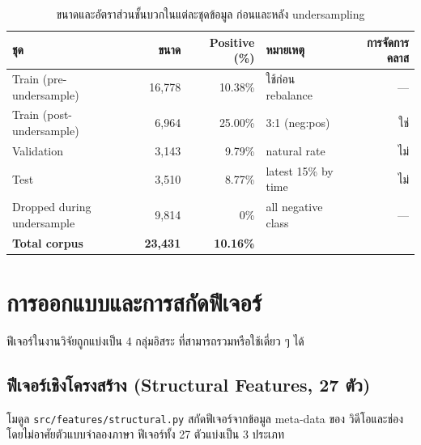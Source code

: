\begin{table}[H]
\centering
\caption{ขนาดและอัตราส่วนชั้นบวกในแต่ละชุดข้อมูล ก่อนและหลัง undersampling}
\label{tab:split-stats}
\begin{tabularx}{\textwidth}{lrrXr}
\toprule
\textbf{ชุด} & \textbf{ขนาด} & \textbf{Positive (\%)} & \textbf{หมายเหตุ} & \textbf{การจัดการคลาส} \\
\midrule
Train (pre-undersample)   & 16{,}778 & 10.38\% & ใช้ก่อน rebalance & --- \\
Train (post-undersample)  & 6{,}964  & 25.00\% & 3:1 (neg:pos) & ใช่ \\
Validation                & 3{,}143  & 9.79\%  & natural rate & ไม่ \\
Test                      & 3{,}510  & 8.77\%  & latest 15\% by time & ไม่ \\
\midrule
Dropped during undersample & 9{,}814 & 0\%      & all negative class & --- \\
\midrule
\textbf{Total corpus}     & \textbf{23{,}431} & \textbf{10.16\%} & & \\
\bottomrule
\end{tabularx}
\end{table}

\section{การออกแบบและการสกัดฟีเจอร์}
\label{sec:method-features}

ฟีเจอร์ในงานวิจัยถูกแบ่งเป็น 4 กลุ่มอิสระ ที่สามารถรวมหรือใช้เดี่ยว ๆ ได้

\subsection{ฟีเจอร์เชิงโครงสร้าง (Structural Features, 27 ตัว)}

โมดูล \texttt{src/features/structural.py} สกัดฟีเจอร์จากข้อมูล meta-data ของ
วิดีโอและช่อง โดยไม่อาศัยตัวแบบจำลองภาษา ฟีเจอร์ทั้ง 27 ตัวแบ่งเป็น
3 ประเภท

